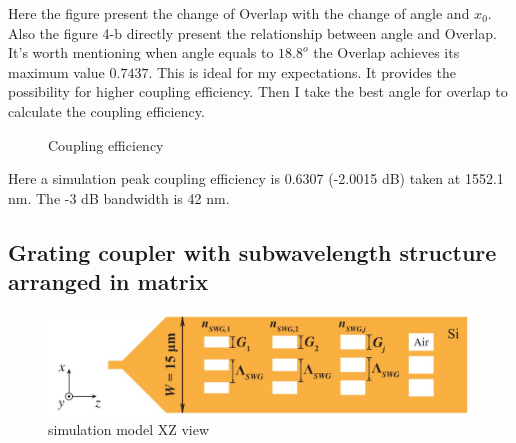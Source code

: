 \documentclass[]{article}
\begin{document}
Here the figure present the change of Overlap with the change of angle and $x_0$. Also the figure 4-b directly present the relationship between angle and Overlap. It's worth mentioning when angle equals to $18.8^o$ the Overlap achieves its maximum value $0.7437$. This is ideal for my expectations. It provides the possibility for higher coupling efficiency. Then I take the best angle for overlap to calculate the coupling efficiency.

\begin{figure}[H]
	\centering
	\caption{Coupling efficiency}
	\label{fig:figure5}
\end{figure}

Here a simulation peak coupling efficiency is 0.6307 (-2.0015 dB) taken at 1552.1 nm. The -3 dB bandwidth is 42 nm.

\subsection{Grating coupler with subwavelength structure arranged in matrix}

\begin{figure}[H]
	\centering
	\includegraphics[width=0.7\linewidth]{figures/figure11.jpg}
	\caption{simulation model XZ view}
	\label{fig:figure11}
  \end{figure}
\end{document}
